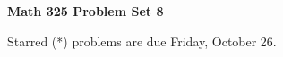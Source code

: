 \documentclass[12pt]{article}
\begin{document}
\def\ctln{\centerline}
\def\msk{\medskip}
\def\bsk{\bigskip}
\def\ssk{\smallskip}
\def\hsk{\hskip.3in}
\def\ra{\rightarrow}
\def\ubr{\underbar}
\def\dsp{\displaystyle}

\def\mt{{\mathcal T}}
\def\mb{{\mathcal B}}
\def\ms{{\mathcal S}}
\def\mu{{\mathcal U}}
\def\mv{{\mathcal V}}

\def\bbr{{\mathbb R}}
\def\bbz{{\mathbb Z}}
\def\bbq{{\mathbb Q}}
\def\bbn{{\mathbb N}}
\def\spc{$~$\hskip.15in$~$}

\def\sset{\subseteq}
\def\del{\partial}
\def\lra{$\Leftrightarrow$}
\def\bra{$\Rightarrow$}




\ctln{\bf Math 325 Problem Set 8}

\msk

\ctln{Starred (*) problems are due Friday, October 26.}
\end{document}
